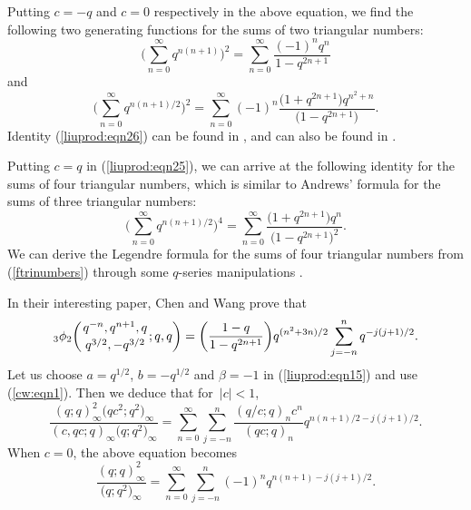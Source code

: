 \documentclass[10pt,a4paper]{amsart}
\numberwithin{equation}{section}
\begin{document}
Putting $c=-q$ and $c=0$ respectively in the above equation, we find the following two generating functions for the sums of two triangular numbers:
\begin{equation} \label{liuprod:eqn26}
	\Biggl(\sum_{n=0}^\infty q^{n(n+1)}\Biggr)^2
	=\sum_{n=0}^\infty \frac{(-1)^n q^n}{1-q^{2n+1}}
\end{equation}
and
\begin{equation*}%
	\Biggl(\sum_{n=0}^\infty q^{n(n+1)/2}\Biggr)^2
	=\sum_{n=0}^\infty (-1)^n \frac{\bigl(1+q^{2n+1}\bigr) q^{n^2+n}}{\bigl(1-q^{2n+1}\bigr)}.
\end{equation*}
Identity (\ref{liuprod:eqn26}) can be found in \cite[p.~397, Entry 18.2.4]{AndrewsBerndt2005}, and can also be found in
\cite[Theorem~3.8]{Liu2020HRjournal}.

Putting $c=q$ in (\ref{liuprod:eqn25}), we can arrive at the following identity for the sums of four triangular numbers, which is similar to Andrews' formula for the sums of three triangular numbers:
\begin{equation}\label{ftrinumbers}
\biggl(\sum_{n=0}^\infty q^{n(n+1)/2}\biggr)^4 =\sum_{n=0}^\infty \frac{\bigl(1+q^{2n+1}\bigr)q^n}{\bigl(1-q^{2n+1}\bigr)^2} .
\end{equation}
We can derive the Legendre formula for the sums of four triangular numbers from (\ref{ftrinumbers}) through some $q$-series manipulations \cite[Entry~18.2.5]{AndrewsBerndt2005}.

In their interesting paper, Chen and Wang \cite[equation~(3.43)]{ChenWang2020} prove that
\begin{equation}\label{cw:eqn1}
{_3\phi_2}\biggl({{q^{-n}, q^{n+1}, q}\atop{q^{3/2}, -q^{3/2}}}; q, q\biggr)
=\biggl(\frac{1-q}{1-q^{2n+1}}\biggr) q^{(n^2+3n)/2}
\sum_{j=-n}^n q^{-j(j+1)/2}.
\end{equation}
Let us choose $a=q^{1/2}$, $b=-q^{1/2}$ and $\beta=-1$ in (\ref{liuprod:eqn15}) and use (\ref{cw:eqn1}). Then we deduce that for~${|c|<1}$,
\begin{equation*}%
\frac{(q; q)_\infty^2 \bigl(qc^2; q^2\bigr)_\infty}{(c, qc; q)_\infty \bigl(q; q^2\bigr)_\infty}
=\sum_{n=0}^\infty \sum_{j=-n}^n \frac{(q/c; q)_n c^n}{(qc; q)_{n}}
q^{n(n+1)/2-j(j+1)/2}.
\end{equation*}
When $c=0$, the above equation becomes
\begin{equation*}%
	\frac{(q; q)_\infty^2 }{\bigl(q; q^2\bigr)_\infty}
	=\sum_{n=0}^\infty \sum_{j=-n}^n {(-1)^n} q^{n(n+1)-j(j+1)/2}.
\end{equation*}
\end{document}

